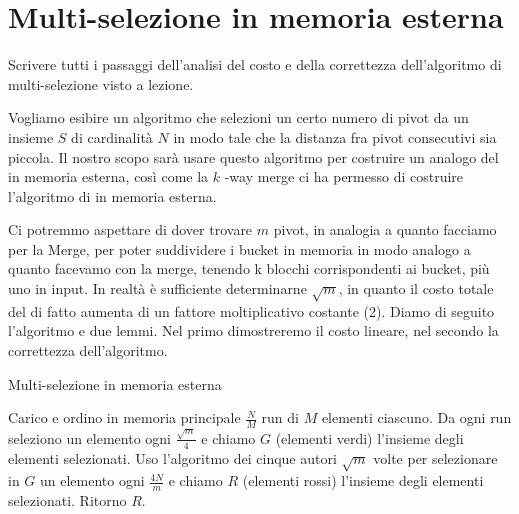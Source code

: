 \chapter{Multi-selezione in memoria esterna}    

\begin{problem*}
    Scrivere tutti i passaggi dell'analisi del costo e della correttezza
    dell'algoritmo di multi-selezione visto a lezione.
\end{problem*}

Vogliamo esibire un algoritmo che selezioni un certo numero di pivot da un
insieme \(S\) di cardinalit\`a \(N\) in modo tale che la distanza fra pivot
consecutivi sia piccola. Il nostro scopo sar\`a usare questo algoritmo per
costruire un analogo del \distributionsort in memoria esterna, così come la \(k\)
-way merge ci ha permesso di costruire l'algoritmo di \mergesort in 
memoria esterna.

Ci potremmo aspettare di dover trovare \(m\) pivot, in analogia a quanto
facciamo per la Merge, per poter suddividere i bucket in memoria in modo analogo
a quanto facevamo con la merge, tenendo k blocchi corrispondenti ai bucket, più uno
in input. In realt\`a \`e sufficiente determinarne \(\sqrt{m}\), in quanto il costo
totale del \distributionsort di fatto aumenta di un fattore moltiplicativo costante (2).
Diamo di seguito l'algoritmo e due lemmi. Nel primo dimostreremo il costo
lineare, nel secondo la correttezza dell'algoritmo.

\begin{algorithm}
    \caption{Multi-selezione in memoria esterna}
    \begin{algorithmic}[1]
        \State Carico e ordino in memoria principale \(\frac{N}{M}\) run
        di \(M\) elementi ciascuno.
        \State Da ogni run seleziono un elemento ogni 
        \(\frac{\sqrt{m}}{4}\) e chiamo \(G\) (elementi verdi) l'insieme 
        degli elementi selezionati.
        \State Uso l'algoritmo dei cinque autori \(\sqrt{m}\) volte per
        selezionare in \(G\) un elemento ogni \(\frac{4N}{m}\) e chiamo 
        \(R\) (elementi rossi) l'insieme degli elementi selezionati.
        \State Ritorno \(R\).
    \end{algorithmic}
\end{algorithm}

